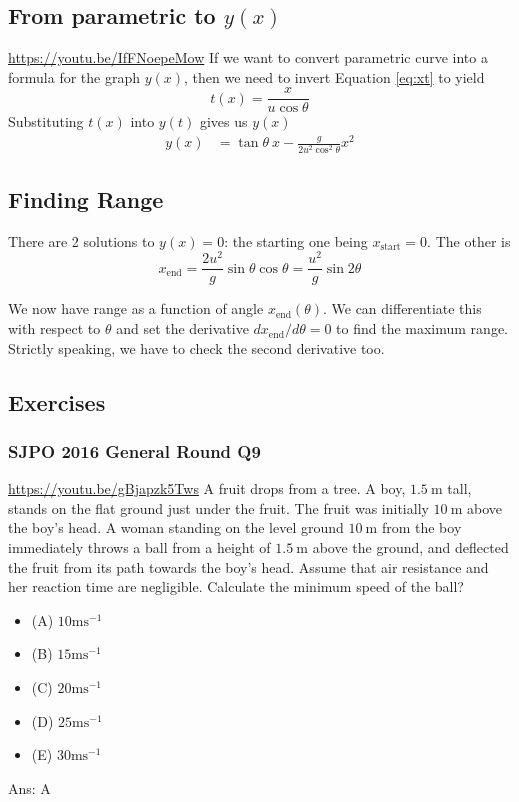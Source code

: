 \documentclass{article}
\begin{document}
\subsection{From parametric to $y(x)$}
\url{https://youtu.be/IfFNoepeMow}
If we want to convert parametric curve into a formula for the graph $y(x)$, then we need to invert Equation \ref{eq:xt} to yield $$t(x) = {\frac{x}{u \cos \theta}}$$
Substituting $t(x)$ into $y(t)$ gives us $y(x)$
\begin{align}
    y(x) &= \tan \theta\ x - \frac{g}{2u^2 \cos^2 \theta} x^2
\end{align}
\subsection{Finding Range}
There are 2 solutions to $y(x) = 0$: the starting one being $x_{\text{start}}=0$. The other is 
$$x_{\text{end}} = \frac{2u^2}{g} \sin \theta \cos \theta = \frac{u^2}{g} \sin 2\theta$$

We now have range as a function of angle $x_{\text{end}}(\theta)$. We can differentiate this with respect to $\theta$ and set the derivative $dx_{\text{end}}/d\theta = 0$ to find the maximum range. Strictly speaking, we have to check the second derivative too.
\subsection{Exercises}
\begin{samepage}
\subsubsection{SJPO 2016 General Round Q9}
\url{https://youtu.be/gBjapzk5Tws}
A fruit drops from a tree. A boy, $1.5 \mathrm{~m}$ tall, stands on the flat ground just under the fruit. The fruit was initially $10 \mathrm{~m}$ above the boy's head. A woman standing on the level ground $10 \mathrm{~m}$ from the boy immediately throws a ball from a height of $1.5 \mathrm{~m}$ above the ground, and deflected the fruit from its path towards the boy's head. Assume that air resistance and her reaction time are negligible. Calculate the minimum speed of the ball?
\begin{itemize}
\item[](A) $10 \mathrm{ms}^{-1}$
\item[](B) $15 \mathrm{ms}^{-1}$
\item[](C) $20 \mathrm{ms}^{-1}$
\item[](D) $25 \mathrm{ms}^{-1}$
\item[](E) $30 \mathrm{ms}^{-1}$
\end{itemize}
Ans: \ifpaper A \fi \\[10pt]
\end{samepage}
\end{document}
